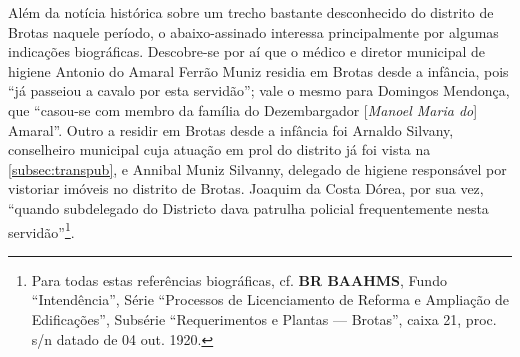 Além da notícia histórica sobre um trecho bastante desconhecido do distrito de Brotas naquele período, o abaixo-assinado interessa principalmente por algumas indicações biográficas. Descobre-se por aí que o médico e diretor municipal de higiene Antonio do Amaral Ferrão Muniz residia em Brotas desde a infância, pois ``já passeiou a cavalo por esta servidão''; vale o mesmo para Domingos Mendonça, que ``casou-se com membro da família do Dezembargador [\textit{Manoel Maria do}] Amaral''. Outro a residir em Brotas desde a infância foi Arnaldo Silvany, conselheiro municipal cuja atuação em prol do distrito já foi vista na \autoref{subsec:transpub}, e Annibal Muniz Silvanny, delegado de higiene responsável por vistoriar imóveis no distrito de Brotas. Joaquim da Costa Dórea, por sua vez, ``quando subdelegado do Districto dava patrulha policial frequentemente nesta servidão''\footnote{Para todas estas referências biográficas, cf. \textbf{BR BAAHMS}, Fundo ``Intendência'', Série ``Processos de Licenciamento de Reforma e Ampliação de Edificações'', Subsérie ``Requerimentos e Plantas --- Brotas'', caixa 21, proc. s/n datado de 04 out. 1920.}. 


